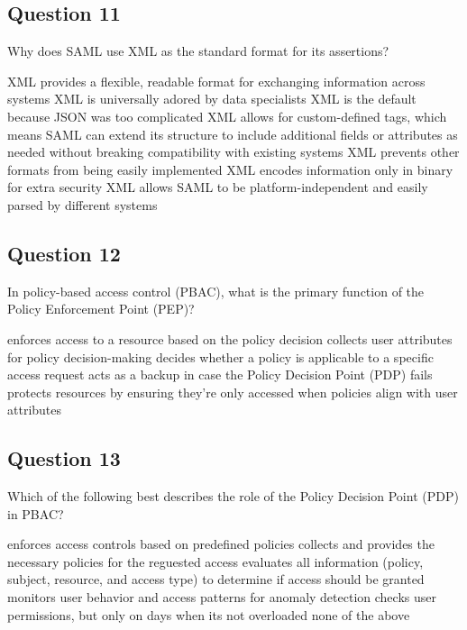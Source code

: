 \subsection*{Question 11}
Why does SAML use XML as the standard format for its assertions?
\begin{itemize}
  \correct  XML provides a flexible, readable format for exchanging
  information across systems
  \incorrect  XML is universally adored by data specialists 
  \incorrect  XML is the default because JSON was too complicated
  \correct  XML allows for custom-defined tags, which means SAML can
  extend its structure to include additional fields or attributes as
  needed without breaking compatibility with existing systems
  \incorrect  XML prevents other formats from being easily implemented 
  \incorrect  XML encodes information only in binary for extra security
  \correct  XML allows SAML to be platform-independent and easily
  parsed by different systems 
\end{itemize}

\subsection*{Question 12}
In policy-based access control (PBAC), what is the primary function of
the Policy Enforcement Point (PEP)?
\begin{itemize}
  \correct enforces access to a resource based on the policy decision 
  \incorrect collects user attributes for policy decision-making
  \incorrect decides whether a policy is applicable to a specific
  access request
  \incorrect acts as a backup in case the Policy Decision Point (PDP)
  fails
  \incorrect protects resources by ensuring they're only accessed when
  policies align with user attributes
\end{itemize}

\subsection*{Question 13}
Which of the following best describes the role of the Policy Decision
Point (PDP) in PBAC?
\begin{itemize}
  \incorrect enforces access controls based on predefined policies
  \incorrect collects and provides the necessary policies for the reguested access
  \correct evaluates all information (policy, subject, resource, and access type) to determine if access should be granted
  \incorrect monitors user behavior and access patterns for anomaly detection
  \incorrect checks user permissions, but only on days when its not overloaded
  \incorrect none of the above
\end{itemize}

